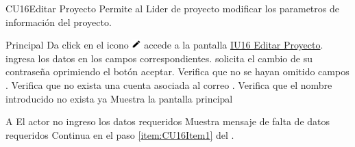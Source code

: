 \begin{UseCase}{CU16}{Editar Proyecto}{
		Permite al Lider de proyecto modificar los parametros de información del proyecto.
	}
	\end{UseCase}
	\begin{UCtrayectoria}{Principal}
		\UCpaso[\UCactor] Da click en el icono \includegraphics[height=10pt]{./images/iconos/ic_create_black_18dp.png}
        \UCpaso [\UCsist] accede a la pantalla \hyperref[fig:IU16]{IU16 Editar Proyecto}. \label{item:CU16Item1}
		\UCpaso[\UCactor] ingresa los datos en los campos correspondientes. 
      \UCpaso[\UCactor]   solicita el cambio de su contraseña oprimiendo el botón aceptar.
		\UCpaso Verifica que no se hayan omitido campos  .
       \UCpaso  Verifica que no exista una cuenta asociada al correo 	.
       \UCpaso Verifica que el nombre introducido no exista ya  
       \UCpaso Muestra la pantalla principal
	\end{UCtrayectoria}

		\begin{UCtrayectoriaA}{A}{ El actor no ingreso los datos requeridos}
			\UCpaso Muestra mensaje de falta de datos requeridos
			\UCpaso Continua en el paso \ref{item:CU16Item1} del .
		\end{UCtrayectoriaA}
        
